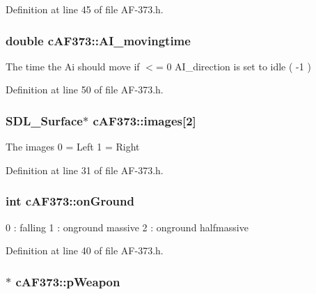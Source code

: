 Definition at line 45 of file A\-F-\/373.\-h.

\hypertarget{classc_a_f373_a71e1ff5478595c4d97464f24bd823dc0}{
\subsubsection[{A\-I\-\_\-movingtime}]{\setlength{\rightskip}{0pt plus 5cm}double c\-A\-F373\-::\-A\-I\-\_\-movingtime}}\label{classc_a_f373_a71e1ff5478595c4d97464f24bd823dc0}
The time the Ai should move if $<$= 0 A\-I\-\_\-direction is set to idle ( -\/1 ) 

Definition at line 50 of file A\-F-\/373.\-h.

\hypertarget{classc_a_f373_aca10c5117c6934072ead1e7b4d43ffa2}{
\subsubsection[{images}]{\setlength{\rightskip}{0pt plus 5cm}S\-D\-L\-\_\-\-Surface$\ast$ c\-A\-F373\-::images\mbox{[}2\mbox{]}}}\label{classc_a_f373_aca10c5117c6934072ead1e7b4d43ffa2}
The images 0 = Left 1 = Right 

Definition at line 31 of file A\-F-\/373.\-h.

\hypertarget{classc_a_f373_a7dba90595edc41a7f89cdd6b2376aa76}{
\subsubsection[{on\-Ground}]{\setlength{\rightskip}{0pt plus 5cm}int c\-A\-F373\-::on\-Ground}}\label{classc_a_f373_a7dba90595edc41a7f89cdd6b2376aa76}
0 \-: falling 1 \-: onground massive 2 \-: onground halfmassive 

Definition at line 40 of file A\-F-\/373.\-h.

\hypertarget{classc_a_f373_a9eb935288b9a2de8d60d96065c22d927}{
\subsubsection[{p\-Weapon}]{$\ast$ c\-A\-F373\-::p\-Weapon}}\label{classc_a_f373_a9eb935288b9a2de8d60d96065c22d927}


